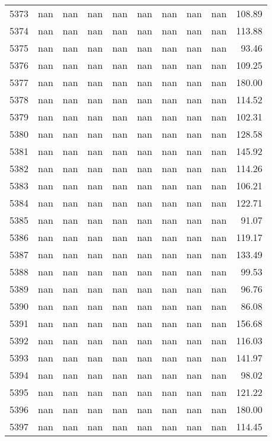 \begin{tabular}{lrrrrrrrrr}
5373 & nan & nan & nan & nan & nan & nan & nan & nan & 108.89 \\
5374 & nan & nan & nan & nan & nan & nan & nan & nan & 113.88 \\
5375 & nan & nan & nan & nan & nan & nan & nan & nan & 93.46 \\
5376 & nan & nan & nan & nan & nan & nan & nan & nan & 109.25 \\
5377 & nan & nan & nan & nan & nan & nan & nan & nan & 180.00 \\
5378 & nan & nan & nan & nan & nan & nan & nan & nan & 114.52 \\
5379 & nan & nan & nan & nan & nan & nan & nan & nan & 102.31 \\
5380 & nan & nan & nan & nan & nan & nan & nan & nan & 128.58 \\
5381 & nan & nan & nan & nan & nan & nan & nan & nan & 145.92 \\
5382 & nan & nan & nan & nan & nan & nan & nan & nan & 114.26 \\
5383 & nan & nan & nan & nan & nan & nan & nan & nan & 106.21 \\
5384 & nan & nan & nan & nan & nan & nan & nan & nan & 122.71 \\
5385 & nan & nan & nan & nan & nan & nan & nan & nan & 91.07 \\
5386 & nan & nan & nan & nan & nan & nan & nan & nan & 119.17 \\
5387 & nan & nan & nan & nan & nan & nan & nan & nan & 133.49 \\
5388 & nan & nan & nan & nan & nan & nan & nan & nan & 99.53 \\
5389 & nan & nan & nan & nan & nan & nan & nan & nan & 96.76 \\
5390 & nan & nan & nan & nan & nan & nan & nan & nan & 86.08 \\
5391 & nan & nan & nan & nan & nan & nan & nan & nan & 156.68 \\
5392 & nan & nan & nan & nan & nan & nan & nan & nan & 116.03 \\
5393 & nan & nan & nan & nan & nan & nan & nan & nan & 141.97 \\
5394 & nan & nan & nan & nan & nan & nan & nan & nan & 98.02 \\
5395 & nan & nan & nan & nan & nan & nan & nan & nan & 121.22 \\
5396 & nan & nan & nan & nan & nan & nan & nan & nan & 180.00 \\
5397 & nan & nan & nan & nan & nan & nan & nan & nan & 114.45 \\

\end{tabular}
